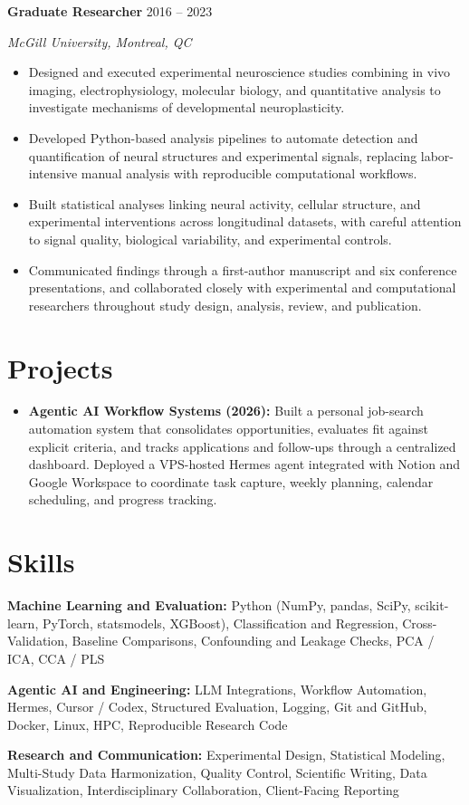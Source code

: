 \documentclass[letterpaper,10pt]{article}
\newcommand{\role}[3]{\textbf{#1} \hfill #3\par\textit{#2}\par}
\begin{document}
\role{Graduate Researcher}{McGill University, Montreal, QC}{2016 -- 2023}
\begin{itemize}
    \item Designed and executed experimental neuroscience studies combining in vivo imaging, electrophysiology, molecular biology, and quantitative analysis to investigate mechanisms of developmental neuroplasticity.
    \item Developed Python-based analysis pipelines to automate detection and quantification of neural structures and experimental signals, replacing labor-intensive manual analysis with reproducible computational workflows.
    \item Built statistical analyses linking neural activity, cellular structure, and experimental interventions across longitudinal datasets, with careful attention to signal quality, biological variability, and experimental controls.
    \item Communicated findings through a first-author manuscript and six conference presentations, and collaborated closely with experimental and computational researchers throughout study design, analysis, review, and publication.
\end{itemize}

\section{Projects}
\begin{itemize}
    \item \textbf{Agentic AI Workflow Systems (2026):} Built a personal job-search automation system that consolidates opportunities, evaluates fit against explicit criteria, and tracks applications and follow-ups through a centralized dashboard. Deployed a VPS-hosted Hermes agent integrated with Notion and Google Workspace to coordinate task capture, weekly planning, calendar scheduling, and progress tracking.
\end{itemize}

\section{Skills}
\textbf{Machine Learning and Evaluation:} Python (NumPy, pandas, SciPy, scikit-learn, PyTorch, statsmodels, XGBoost), Classification and Regression, Cross-Validation, Baseline Comparisons, Confounding and Leakage Checks, PCA / ICA, CCA / PLS\par\vspace{2pt}
\textbf{Agentic AI and Engineering:} LLM Integrations, Workflow Automation, Hermes, Cursor / Codex, Structured Evaluation, Logging, Git and GitHub, Docker, Linux, HPC, Reproducible Research Code\par\vspace{2pt}
\textbf{Research and Communication:} Experimental Design, Statistical Modeling, Multi-Study Data Harmonization, Quality Control, Scientific Writing, Data Visualization, Interdisciplinary Collaboration, Client-Facing Reporting
\end{document}
